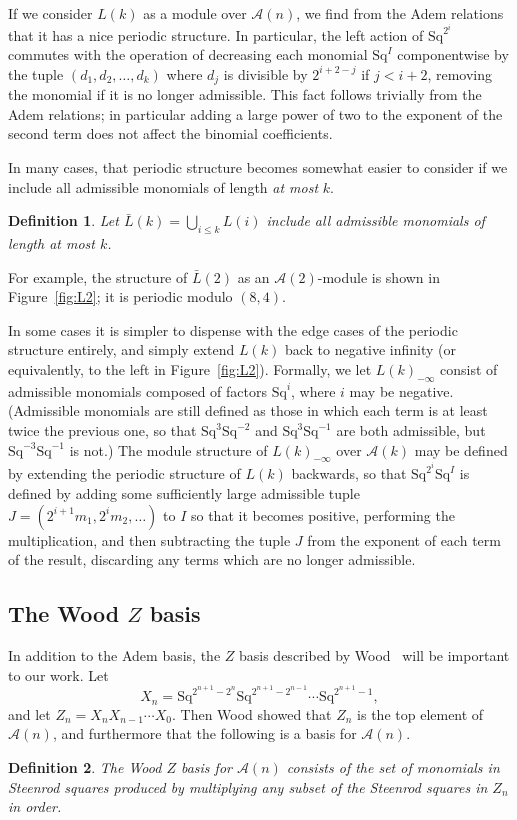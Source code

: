 \documentclass{article}
\newcommand{\A}{\mathcal{A}}
\newcommand{\Sq}{\mathrm{Sq}}
\renewcommand{\L}{\bar{L}}
\newcommand{\Lkm}[1][k]{L{(#1)}_{-\infty}}
\newtheorem{defn}{Definition}
\begin{document}
If we consider $L(k)$ as a module over $\A(n)$, we find from the Adem relations that it has a nice periodic structure.  In particular, the left action of $\Sq^{2^i}$ commutes with the operation of decreasing each monomial $\Sq^I$ componentwise by the tuple $(d_1, d_2, \ldots, d_k)$ where $d_j$ is divisible by $2^{i+2-j}$ if $j<i+2$, removing the monomial if it is no longer admissible.  This fact follows trivially from the Adem relations; in particular adding a large power of two to the exponent of the second term does not affect the binomial coefficients.

In many cases, that periodic structure becomes somewhat easier to consider if we include all admissible monomials of length \emph{at most} $k$.
\begin{defn}
  Let $\L(k)=\bigcup_{i\leq k}L(i)$ include all admissible monomials of length \emph{at most} $k$.
\end{defn}

For example, the structure of $\L(2)$ as an $\A(2)$-module is shown in Figure~\ref{fig:L2}; it is periodic modulo $(8, 4)$.

In some cases it is simpler to dispense with the edge cases of the periodic structure entirely, and simply extend $L(k)$ back to negative infinity (or equivalently, to the left in Figure~\ref{fig:L2}).  Formally, we let $\Lkm$ consist of admissible monomials composed of factors $\Sq^i$, where $i$ may be negative.  (Admissible monomials are still defined as those in which each term is at least twice the previous one, so that $\Sq^3\Sq^{-2}$ and $\Sq^3\Sq^{-1}$ are both admissible, but $\Sq^{-3}\Sq^{-1}$ is not.)  The module structure of $\Lkm$ over $\A(k)$ may be defined by extending the periodic structure of $L(k)$ backwards, so that $\Sq^{2^i}\Sq^I$ is defined by adding some sufficiently large admissible tuple $J=(2^{i+1}m_1, 2^im_2, \ldots)$ to $I$ so that it becomes positive, performing the multiplication, and then subtracting the tuple $J$ from the exponent of each term of the result, discarding any terms which are no longer admissible.


\subsection{The Wood \boldmath$Z$ basis}
In addition to the Adem basis, the $Z$ basis described by Wood~\cite{wood} will be important to our work.  Let
\[ X_n = \Sq^{2^{n+1}-2^n}\Sq^{2^{n+1}-2^{n-1}}\cdots\Sq^{2^{n+1}-1}, \]
and let $Z_n = X_n X_{n-1}\cdots X_0$.  Then Wood showed that $Z_n$ is the top element of $\A(n)$, and furthermore that the following is a basis for $\A(n)$.
\begin{defn}
  The Wood $Z$ basis for $\A(n)$ consists of the set of monomials in Steenrod squares produced by multiplying any subset of the Steenrod squares in $Z_n$ in order.
\end{defn}
\end{document}

